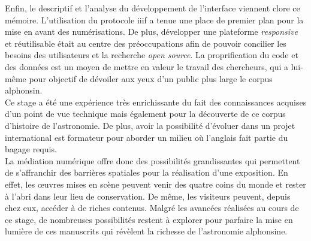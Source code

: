 	Enfin, le descriptif et l'analyse du développement de l'interface viennent clore ce mémoire. L'utilisation du protocole \acrshort{iiif} a tenue une place de premier plan pour la mise en avant des numérisations. De plus, développer une plateforme \textit{responsive} et réutilisable était au centre des préoccupations afin de pouvoir concilier les besoins des utilisateurs et la recherche \textit{open source}. La proprification du code et des données est un moyen de mettre en valeur le travail des chercheurs, qui a lui-même pour objectif de dévoiler aux yeux d'un public plus large le corpus alphonsin. \\
	
	Ce stage a été une expérience très enrichissante du fait des connaissances acquises d'un point de vue technique mais également pour la découverte de ce corpus d'histoire de l'astronomie. De plus, avoir la possibilité d'évoluer dans un projet international est formateur pour aborder un milieu où l'anglais fait partie du bagage requis. \\
	
	La médiation numérique offre donc des possibilités grandissantes qui permettent de s'affranchir des barrières spatiales pour la réalisation d'une exposition. En effet, les œuvres mises en scène peuvent venir des quatre coins du monde et rester à l'abri dans leur lieu de conservation. De même, les visiteurs peuvent, depuis chez eux, accéder à de riches contenus. Malgré les avancées réalisées au cours de ce stage, de nombreuses possibilités restent à explorer pour parfaire la mise en lumière de ces manuscrits qui révèlent la richesse de l'astronomie alphonsine. 
